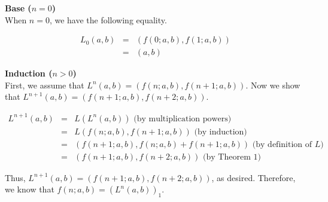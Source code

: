 \documentclass[11pt]{article}
\begin{document}
\begin{prob}{3}
\end{prob}
\begin{sol}

\textbf{Base ($n = 0$)} \\
When $n = 0$, we have the following equality.

\begin{eqnarray*}
L_{0}(a,b) & = & (f(0;a,b),f(1;a,b)) \\
& = & (a, b)
\end{eqnarray*}

\textbf{Induction ($n > 0$)} \\
First, we assume that $L^{n}(a,b) = (f(n;a,b),f(n + 1;a,b))$. Now we show that $L^{n+1}(a,b) = (f(n + 1;a,b),f(n + 2;a,b))$.

\begin{eqnarray*}
L^{n + 1}(a,b) & = & L(L^{n}(a,b)) \text{ (by multiplication powers)}\\
& = & L(f(n;a,b),f(n + 1;a,b)) \text{ (by induction)} \\
& = & (f(n + 1;a,b), f(n;a,b) + f(n + 1;a,b)) \text{ (by definition of $L$)} \\
& = & (f(n + 1;a,b), f(n + 2;a,b)) \text{ (by Theorem 1)}
\end{eqnarray*}

Thus, $L^{n+1}(a,b) = (f(n + 1;a,b),f(n + 2;a,b))$, as desired. Therefore, we know that $f(n;a,b) = (L^{n}(a,b))_{1}$.

\end{sol}
\end{document}
